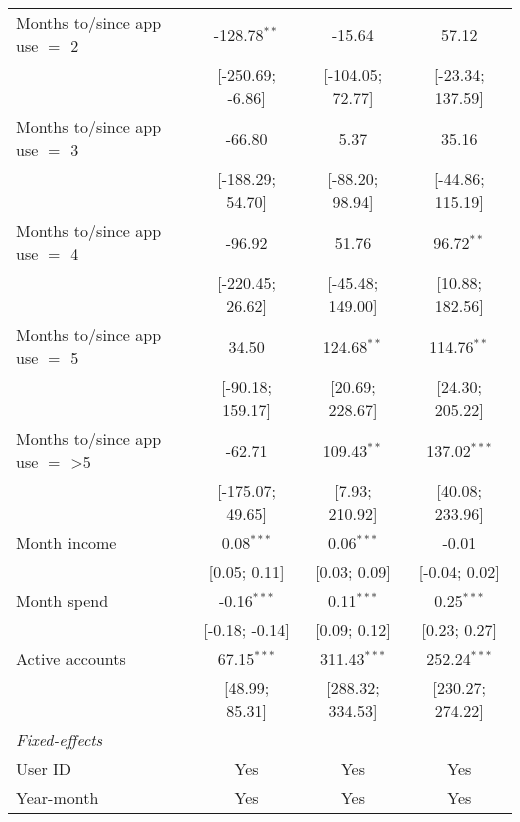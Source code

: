 \begin{table}[htbp]
\begin{threeparttable}[b]
\begin{tabular}{lccc}
         Months to/since app use $=$ 2   & -128.78$^{**}$    & -15.64           & 57.12\\   
                                         & [-250.69; -6.86]  & [-104.05; 72.77] & [-23.34; 137.59]\\   
         Months to/since app use $=$ 3   & -66.80            & 5.37             & 35.16\\   
                                         & [-188.29; 54.70]  & [-88.20; 98.94]  & [-44.86; 115.19]\\   
         Months to/since app use $=$ 4   & -96.92            & 51.76            & 96.72$^{**}$\\   
                                         & [-220.45; 26.62]  & [-45.48; 149.00] & [10.88; 182.56]\\   
         Months to/since app use $=$ 5   & 34.50             & 124.68$^{**}$    & 114.76$^{**}$\\   
                                         & [-90.18; 159.17]  & [20.69; 228.67]  & [24.30; 205.22]\\   
         Months to/since app use $=$ >5  & -62.71            & 109.43$^{**}$    & 137.02$^{***}$\\   
                                         & [-175.07; 49.65]  & [7.93; 210.92]   & [40.08; 233.96]\\   
         Month income                    & 0.08$^{***}$      & 0.06$^{***}$     & -0.01\\   
                                         & [0.05; 0.11]      & [0.03; 0.09]     & [-0.04; 0.02]\\   
         Month spend                     & -0.16$^{***}$     & 0.11$^{***}$     & 0.25$^{***}$\\   
                                         & [-0.18; -0.14]    & [0.09; 0.12]     & [0.23; 0.27]\\   
         Active accounts                 & 67.15$^{***}$     & 311.43$^{***}$   & 252.24$^{***}$\\   
                                         & [48.99; 85.31]    & [288.32; 334.53] & [230.27; 274.22]\\   
         \midrule
         \emph{Fixed-effects}\\
         User ID                         & Yes               & Yes              & Yes\\  
         Year-month                      & Yes               & Yes              & Yes\\  
         \midrule

\end{tabular}
\end{threeparttable}
\end{table}
